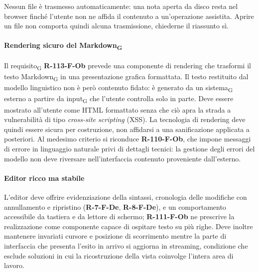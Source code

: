 \documentclass[a4paper, 10pt]{article}
\begin{document}
Nessun file è trasmesso automaticamente: una nota aperta da disco resta nel browser finché l'utente non ne affida il contenuto a un'operazione assistita. Aprire un file non comporta quindi alcuna trasmissione, chiederne il riassunto sì.

\paragraph{Rendering sicuro del Markdown\textsubscript{G}}
Il requisito\textsubscript{G} \textbf{R-113-F-Ob} prevede una componente di rendering che trasformi il testo Markdown\textsubscript{G} in una presentazione grafica formattata. Il testo restituito dal modello linguistico non è però contenuto fidato: è generato da un sistema\textsubscript{G} esterno a partire da input\textsubscript{G} che l'utente controlla solo in parte. Deve essere mostrato all'utente come HTML formattato senza che ciò apra la strada a vulnerabilità di tipo \textit{cross-site scripting} (XSS). La tecnologia di rendering deve quindi essere sicura per costruzione, non affidarsi a una sanificazione applicata a posteriori. Al medesimo criterio si riconduce \textbf{R-110-F-Ob}, che impone messaggi di errore in linguaggio naturale privi di dettagli tecnici: la gestione degli errori del modello non deve riversare nell'interfaccia contenuto proveniente dall'esterno.

\paragraph{Editor ricco ma stabile}
L'editor deve offrire evidenziazione della sintassi, cronologia delle modifiche con annullamento e ripristino (\textbf{R-7-F-De}, \textbf{R-8-F-De}), e un comportamento accessibile da tastiera e da lettore di schermo; \textbf{R-111-F-Ob} ne prescrive la realizzazione come componente capace di ospitare testo su più righe. Deve inoltre mantenere invariati cursore e posizione di scorrimento mentre la parte di interfaccia che presenta l'esito in arrivo si aggiorna in streaming, condizione che esclude soluzioni in cui la ricostruzione della vista coinvolge l'intera area di lavoro.
\end{document}
